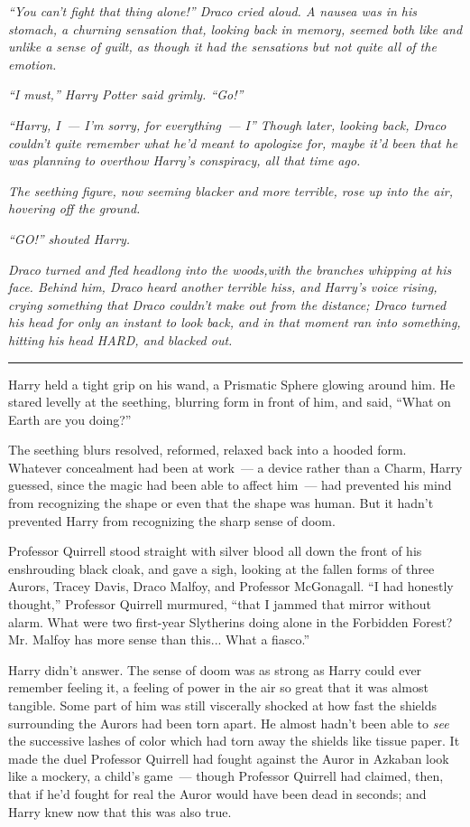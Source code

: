 \emph{``You can't fight that thing alone!'' Draco cried aloud. A nausea was in his stomach, a churning sensation that, looking back in memory, seemed both like and unlike a sense of guilt, as though it had the sensations but not quite all of the emotion.}

\emph{``I must,'' Harry Potter said grimly. ``Go!''}

\emph{``Harry, I~--- I'm sorry, for everything~--- I'' Though later, looking back, Draco couldn't quite remember what he'd meant to apologize for, maybe it'd been that he was planning to overthow Harry's conspiracy, all that time ago.}

\emph{The seething figure, now seeming blacker and more terrible, rose up into the air, hovering off the ground.}

\emph{``GO!'' shouted Harry.}

\emph{Draco turned and fled headlong into the woods,with the branches whipping at his face. Behind him, Draco heard another terrible hiss, and Harry's voice rising, crying something that Draco couldn't make out from the distance; Draco turned his head for only an instant to look back, and in that moment ran into something, hitting his head HARD, and blacked out.}

\begin{center}\rule{3in}{0.4pt}\end{center}

Harry held a tight grip on his wand, a Prismatic Sphere glowing around him. He stared levelly at the seething, blurring form in front of him, and said, ``What on Earth are you doing?''

The seething blurs resolved, reformed, relaxed back into a hooded form. Whatever concealment had been at work~--- a device rather than a Charm, Harry guessed, since the magic had been able to affect him~--- had prevented his mind from recognizing the shape or even that the shape was human. But it hadn't prevented Harry from recognizing the sharp sense of doom.

Professor Quirrell stood straight with silver blood all down the front of his enshrouding black cloak, and gave a sigh, looking at the fallen forms of three Aurors, Tracey Davis, Draco Malfoy, and Professor McGonagall. ``I had honestly thought,'' Professor Quirrell murmured, ``that I jammed that mirror without alarm. What were two first-year Slytherins doing alone in the Forbidden Forest? Mr. Malfoy has more sense than this... What a fiasco.''

Harry didn't answer. The sense of doom was as strong as Harry could ever remember feeling it, a feeling of power in the air so great that it was almost tangible. Some part of him was still viscerally shocked at how fast the shields surrounding the Aurors had been torn apart. He almost hadn't been able to \emph{see} the successive lashes of color which had torn away the shields like tissue paper. It made the duel Professor Quirrell had fought against the Auror in Azkaban look like a mockery, a child's game~--- though Professor Quirrell had claimed, then, that if he'd fought for real the Auror would have been dead in seconds; and Harry knew now that this was also true.

